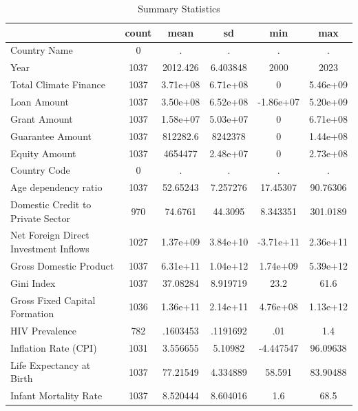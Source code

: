 \begin{table}[htbp]\centering
\def\sym#1{\ifmmode^{#1}\else\(^{#1}\)\fi}
\caption{Summary Statistics}
\begin{tabular}{l*{1}{ccccc}}
\hline\hline
                    &       count&        mean&          sd&         min&         max\\
\hline
Country Name        &           0&           .&           .&           .&           .\\
Year                &        1037&    2012.426&    6.403848&        2000&        2023\\
Total Climate Finance&        1037&    3.71e+08&    6.71e+08&           0&    5.46e+09\\
Loan Amount         &        1037&    3.50e+08&    6.52e+08&   -1.86e+07&    5.20e+09\\
Grant Amount        &        1037&    1.58e+07&    5.03e+07&           0&    6.71e+08\\
Guarantee Amount    &        1037&    812282.6&     8242378&           0&    1.44e+08\\
Equity Amount       &        1037&     4654477&    2.48e+07&           0&    2.73e+08\\
Country Code        &           0&           .&           .&           .&           .\\
Age dependency ratio&        1037&    52.65243&    7.257276&    17.45307&    90.76306\\
Domestic Credit to Private Sector&         970&     74.6761&     44.3095&    8.343351&    301.0189\\
Net Foreign Direct Investment Inflows&        1027&    1.37e+09&    3.84e+10&   -3.71e+11&    2.36e+11\\
Gross Domestic Product&        1037&    6.31e+11&    1.04e+12&    1.74e+09&    5.39e+12\\
Gini Index          &        1037&    37.08284&    8.919719&        23.2&        61.6\\
Gross Fixed Capital Formation&        1036&    1.36e+11&    2.14e+11&    4.76e+08&    1.13e+12\\
HIV Prevalence      &         782&    .1603453&    .1191692&         .01&         1.4\\
Inflation Rate (CPI)&        1031&    3.556655&     5.10982&   -4.447547&    96.09638\\
Life Expectancy at Birth&        1037&    77.21549&    4.334889&      58.591&    83.90488\\
Infant Mortality Rate&        1037&    8.520444&    8.604016&         1.6&        68.5\\

\end{tabular}
\end{table}
